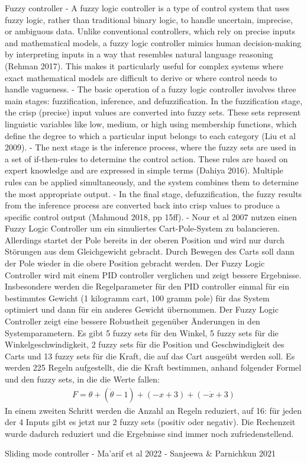Fuzzy controller
- A fuzzy logic controller is a type of control system that uses fuzzy logic, rather than traditional binary logic, to handle uncertain, imprecise, or ambiguous data. Unlike conventional controllers, which rely on precise inputs and mathematical models, a fuzzy logic controller mimics human decision-making by interpreting inputs in a way that resembles natural language reasoning (Rehman 2017). This makes it particularly useful for complex systems where exact mathematical models are difficult to derive or where control needs to handle vagueness.
- The basic operation of a fuzzy logic controller involves three main stages: fuzzification, inference, and defuzzification. In the fuzzification stage, the crisp (precise) input values are converted into fuzzy sets. These sets represent linguistic variables like low, medium, or high using membership functions, which define the degree to which a particular input belongs to each category (Liu et al 2009).
- The next stage is the inference process, where the fuzzy sets are used in a set of if-then-rules to determine the control action. These rules are based on expert knowledge and are expressed in simple terms (Dahiya 2016). Multiple rules can be applied simultaneously, and the system combines them to determine the most appropriate output.
- In the final stage, defuzzification, the fuzzy results from the inference process are converted back into crisp values to produce a specific control output (Mahmoud 2018, pp 15ff).
- Nour et al 2007 nutzen einen Fuzzy Logic Controller um ein simuliertes Cart-Pole-System zu balancieren. Allerdings startet der Pole bereits in der oberen Position und wird nur durch Störungen aus dem Gleichgewicht gebracht. Durch Bewegen des Carts soll dann der Pole wieder in die obere Position gebracht werden. Der Fuzzy Logic Controller wird mit einem PID controller verglichen und zeigt bessere Ergebnisse. Insbesondere werden die Regelparameter für den PID controller einmal für ein bestimmtes Gewicht (1 kilogramm cart, 100 gramm pole) für das System optimiert und dann für ein anderes Gewicht übernommen. Der Fuzzy Logic Controller zeigt eine bessere Robustheit gegenüber Änderungen in den Systemparametern. Es gibt 5 fuzzy sets für den Winkel, 5 fuzzy sets für die Winkelgeschwindigkeit, 2 fuzzy sets für die Position und Geschwindigkeit des Carts und 13 fuzzy sets für die Kraft, die auf das Cart ausgeübt werden soll. Es werden 225 Regeln aufgestellt, die die Kraft bestimmen, anhand folgender Formel und den fuzzy sets, in die die Werte fallen:
\begin{align}
    F = \theta + (\dot{\theta}-1) + (-x+3) + (-\dot{x}+3)
\end{align}
In einem zweiten Schritt werden die Anzahl an Regeln reduziert, auf 16: für jeden der 4 Inputs gibt es jetzt nur 2 fuzzy sets (positiv oder negativ). Die Rechenzeit wurde dadurch reduziert und die Ergebnisse sind immer noch zufriedenstellend.

Sliding mode controller
- Ma'arif et al 2022
- Sanjeewa & Parnichkun 2021
